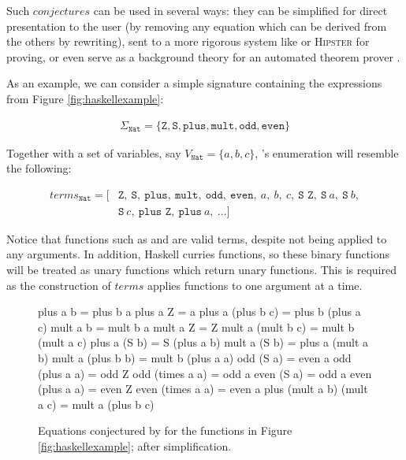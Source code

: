 Such $conjectures$ can be used in several ways: they can be simplified for
direct presentation to the user (by removing any equation which can be derived
from the others by rewriting), sent to a more rigorous system like \hspec{} or
\textsc{Hipster} for proving, or even serve as a background theory for an
automated theorem prover \cite{claessen2013automating}.

As an example, we can consider a simple signature containing the expressions
from Figure \ref{fig:haskellexample}:

\begin{align*}
  \Sigma_{\texttt{Nat}} = \{\texttt{Z}, \texttt{S}, \texttt{plus}, \texttt{mult}, \texttt{odd}, \texttt{even}\}
\end{align*}

Together with a set of variables, say $V_{\texttt{Nat}} = \{a, b, c\}$,
\qspec{}'s enumeration will resemble the following:

\begin{align*}
  terms_{\texttt{Nat}} = [& \texttt{Z},\ \texttt{S},\ \texttt{plus},\ \texttt{mult},\ \texttt{odd},\ \texttt{even},\ a,\ b,\ c,\ \texttt{S Z},\ \texttt{S}\ a,\ \texttt{S}\ b, \\
                     & \texttt{S}\ c,\ \texttt{plus Z},\ \texttt{plus}\ a,\ \dots ]
\end{align*}

Notice that functions such as  and  are valid terms, despite
not being applied to any arguments. In addition, Haskell curries functions, so
these binary functions will be treated as unary functions which return unary
functions. This is required as the construction of $terms$ applies functions to
one argument at a time.

\begin{figure}
  \begin{haskell}
                  plus a b = plus b a
                  plus a Z = a
         plus a (plus b c) = plus b (plus a c)
                  mult a b = mult b a
                  mult a Z = Z
         mult a (mult b c) = mult b (mult a c)
              plus a (S b) = S (plus a b)
              mult a (S b) = plus a (mult a b)
         mult a (plus b b) = mult b (plus a a)
                 odd (S a) = even a
            odd (plus a a) = odd Z
           odd (times a a) = odd a
                even (S a) = odd a
           even (plus a a) = even Z
          even (times a a) = even a
plus (mult a b) (mult a c) = mult a (plus b c)
  \end{haskell}
  \caption{Equations conjectured by \qspec{} for the functions in Figure \ref{fig:haskellexample}; after simplification.}
  \label{fig:qspecresult}
\end{figure}

